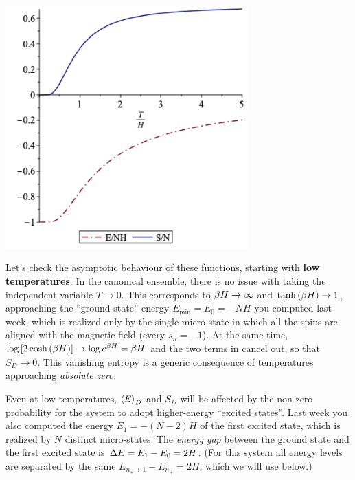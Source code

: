 \begin{center}
  \includegraphics[width=0.7\textwidth]{figs/week03_distinguish.pdf}
\end{center}

Let's check the asymptotic behaviour of these functions, starting with \textbf{low temperatures}.
In the canonical ensemble, there is no issue with taking the independent variable $T \to 0$.
This corresponds to $\beta H \to \infty$ and $\tanh\left(\beta H\right) \to 1$, approaching the ``ground-state'' energy $E_{\text{min}} = E_0 = -NH$ you computed last week, which is realized only by the single micro-state in which all the spins are aligned with the magnetic field (every $s_n = -1$).
At the same time, $\log\left[2\cosh\left(\beta H\right)\right] \to \log e^{\beta H} = \beta H$ and the two terms in  cancel out, so that $S_D \to 0$.
This vanishing entropy is a generic consequence of temperatures approaching \textit{absolute zero}.

Even at low temperatures, $\left\langle E \right\rangle_D$ and $S_D$ will be affected by the non-zero probability for the system to adopt higher-energy ``excited states''.
Last week you also computed the energy $E_1 = -(N - 2)H$ of the first excited state, which is realized by $N$ distinct micro-states.
The \textit{energy gap} between the ground state and the first excited state is $\Delta E = E_1 - E_0 = 2H$.
(For this system all energy levels are separated by the same $E_{n_+ + 1} - E_{n_+} = 2H$, which we will use below.)

